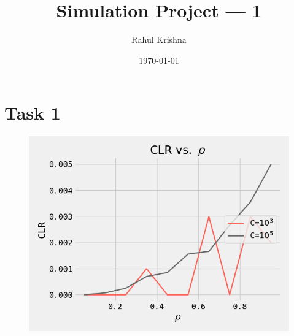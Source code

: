 \documentclass[10pt, twocolumn]{article}
\title{\textbf{Simulation Project --- 1}}
\author{Rahul Krishna}
\affil{North Carolina State University\thanks{Source code: \url{https://github.com/rahlk/CSC579__Computer_Performance_Modeling}}}
\date{\today}
\begin{document}
\maketitle
\section{Task 1}
\begin{figure}[h!]
 \centering
 \includegraphics[width=\linewidth]{Figures/task1.png}
\end{figure}
\end{document}
